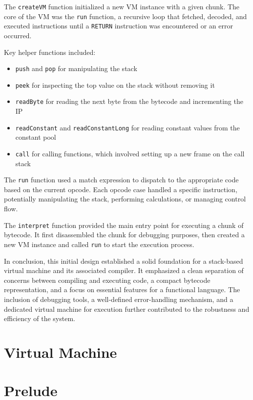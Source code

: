 The \texttt{createVM} function initialized a new VM instance with a given chunk.
The core of the VM was the \texttt{run} function, a recursive loop that fetched, decoded, and executed instructions until a \texttt{RETURN} instruction was encountered or an error occurred.

Key helper functions included:

\begin{itemize}
    \item \texttt{push} and \texttt{pop} for manipulating the stack
    \item \texttt{peek} for inspecting the top value on the stack without removing it
    \item \texttt{readByte} for reading the next byte from the bytecode and incrementing the IP
    \item \texttt{readConstant} and \texttt{readConstantLong} for reading constant values from the constant pool
    \item \texttt{call} for calling functions, which involved setting up a new frame on the call stack
\end{itemize}

The \texttt{run} function used a match expression to dispatch to the appropriate code based on the current opcode.
Each opcode case handled a specific instruction, potentially manipulating the stack, performing calculations, or managing control flow.

The \texttt{interpret} function provided the main entry point for executing a chunk of bytecode.
It first disassembled the chunk for debugging purposes, then created a new VM instance and called \texttt{run} to start the execution process.

In conclusion, this initial design established a solid foundation for a stack-based virtual machine and its associated compiler.
It emphasized a clean separation of concerns between compiling and executing code, a compact bytecode representation, and a focus on essential features for a functional language. The inclusion of debugging tools, a well-defined error-handling mechanism, and a dedicated virtual machine for execution further contributed to the robustness and efficiency of the system.

\section{Virtual Machine}\label{sec:virtual-machine}

\section{Prelude}\label{sec:prelude}

